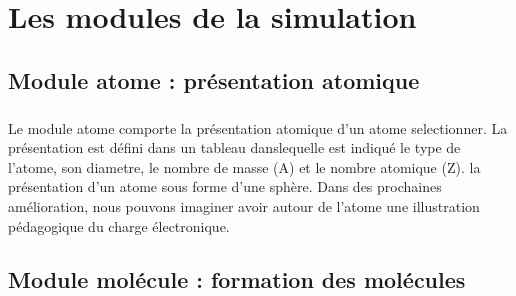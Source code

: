 \chapter{Les modules de la simulation}
\label{les_modules_de_la_simulation}

\newcommand*{\mytextstyle}{\sffamily\Large\bfseries\color{black!85}}
\newcommand{\arcarrow}[3]{%
   \pgfmathsetmacro{\rin}{1.7}
   \pgfmathsetmacro{\rmid}{2.2}
   \pgfmathsetmacro{\rout}{2.7}
   \pgfmathsetmacro{\astart}{#1}
   \pgfmathsetmacro{\aend}{#2}
   \pgfmathsetmacro{\atip}{5}
   \fill[mygray, very thick] (\astart+\atip:\rin)
                         arc (\astart+\atip:\aend:\rin)
      -- (\aend-\atip:\rmid)
      -- (\aend:\rout)   arc (\aend:\astart+\atip:\rout)
      -- (\astart:\rmid) -- cycle;
   \path[
      decoration = {
         text along path,
         text = {|\mytextstyle|#3},
         text align = {align = center},
         raise = -1.0ex
      },
      decorate
   ](\astart+\atip:\rmid) arc (\astart+\atip:\aend+\atip:\rmid);
}
\section{ Module atome : présentation atomique }

\paragraph{}
Le module atome comporte la présentation atomique d'un atome selectionner. La présentation est défini dans un tableau danslequelle est indiqué le type de l'atome, son diametre, le nombre de masse (A) et le nombre atomique (Z).
la présentation d'un atome sous forme d'une sphère. Dans des prochaines amélioration, nous pouvons imaginer avoir autour de l'atome une illustration pédagogique du charge électronique.
\section{ Module molécule : formation des molécules}
